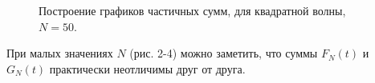 \documentclass[a5paper, 10pt]{article}
\theoremstyle{definition}
\theoremstyle{plain}
\theoremstyle{remark}
\begin{document}
\begin{figure}[h]
\begin{minipage}[h]{0.5\linewidth}
\end{minipage}
\hfill
\begin{minipage}[h]{0.5\linewidth}
\end{minipage}
\caption{Построение графиков частичных сумм, для квадратной волны, $N=50$.}
\end{figure}


При малых значениях $N$ (рис. 2-4) можно заметить, что суммы $F_N(t)$ и $G_N(t)$ практически неотличимы друг от друга.
\end{document}
